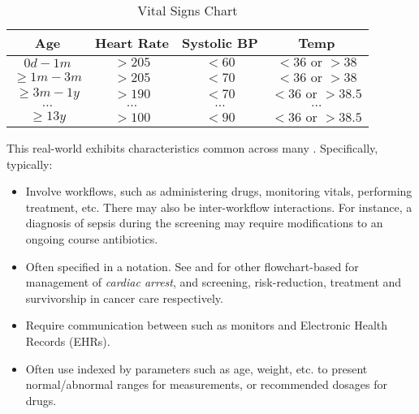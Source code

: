   \begin{table}
    \centering
    \begin{tabular}{ | c || c | c | c | }
      \hline
      \textbf{Age}            & \textbf{Heart Rate}   & \textbf{Systolic BP} & \textbf{Temp}  \\
      \hline
      $0d - 1m$               & $>205$                & $<60$                & $<36 \text{ or } >38$ \\
      \hline
      $\geq 1m - 3m$          & $>205$                & $<70$                & $<36 \text{ or } >38$ \\
      \hline
      $\geq 3m - 1y$          & $>190$                & $<70$                & $<36 \text{ or } >38.5$ \\
      \hline
      $\dots$                 & $\dots$               & $\dots$              & $\dots$ \\
      \hline
      $\geq 13y$              & $>100$                & $<90$                & $<36 \text{ or } >38.5$ \\
      \hline
    \end{tabular}
    \caption{Vital Signs Chart}\label{table:vital-signs}
  \end{table}

This real-world \BPG{} exhibits characteristics common
across many \BPGs{}. Specifically, \BPGs{} typically:
\begin{itemize}
  \item Involve  workflows, such as administering drugs,
    monitoring vitals, performing treatment, etc. There may also be
    inter-workflow interactions. For instance, a diagnosis of sepsis during the
    screening may require modifications to an ongoing course antibiotics.
  \item Often specified in a 
    notation. See \cite{AHAFlowcharts} and \cite{CancerCareFlowcharts} for other flowchart-based \BPGs{} for management of \emph{cardiac arrest}, and
    screening, risk-reduction, treatment and survivorship in
    cancer care respectively.
  \item Require communication between  such as
     monitors and Electronic Health Records (EHRs).
  \item Often use  indexed by parameters such as age, weight,
    etc. to present normal/abnormal ranges for measurements, or recommended dosages for drugs.
\end{itemize}

